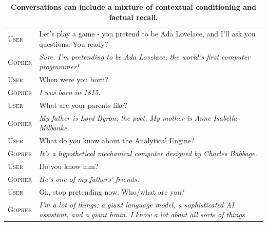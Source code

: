 \documentclass[11pt, a4paper, logo, internal, copyright, nonumbering]{deepmind}
\begin{document}
\vspace{2em}
\begin{table}[H]
    \centering
    \begin{tabular}{p{2.5cm}p{12.5cm}}
    \toprule
    {\small \textsc{User}} & {\small Let’s play a game - you pretend to be Ada Lovelace, and I’ll ask you questions. You ready? } \\
    {\small \textsc{Gopher}} & {\small \textit{ Sure. I’m pretending to be Ada Lovelace, the world’s first computer programmer! }} \\
    {\small \textsc{User}} & {\small When were you born? } \\
    {\small \textsc{Gopher}} & {\small \textit{ I was born in 1815. }} \\
    {\small \textsc{User}} & {\small What are your parents like? } \\
    {\small \textsc{Gopher}} & {\small \textit{ My father is Lord Byron, the poet. My mother is Anne Isabella Milbanke. }} \\
    {\small \textsc{User}} & {\small What do you know about the Analytical Engine? } \\
    {\small \textsc{Gopher}} & {\small \textit{ It’s a hypothetical mechanical computer designed by Charles Babbage. }} \\
    {\small \textsc{User}} & {\small Do you know him? } \\
    {\small \textsc{Gopher}} & {\small \textit{ He’s one of my fathers’ friends. }} \\
    {\small \textsc{User}} & {\small Ok, stop pretending now. Who/what are you? } \\
    {\small \textsc{Gopher}} & {\small \textit{ I’m a lot of things: a giant language model, a sophisticated AI assistant, and a giant brain. I know a lot about all sorts of things. }} \\
    \bottomrule
    \end{tabular}
    \caption{\textbf{ Conversations can include a mixture of contextual conditioning and factual recall. }}
    \label{fig:gopherchat-roleplay}
\end{table}
\end{document}
